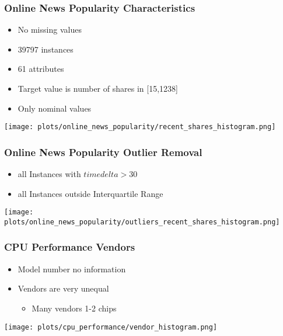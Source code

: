 \documentclass[aspectratio=169]{beamer}
\begin{document}

\begin{frame}{}
\frametitle{Online News Popularity Characteristics}
\begin{minipage}{0.3\textwidth}
\begin{itemize}
\item No missing values
\item 39797 instances
\item 61 attributes
\item Target value is number of shares in [15,1238]
\item Only nominal values
\end{itemize}
\end{minipage}
\begin{minipage}{0.69\textwidth}
    \texttt{[image: plots/online\_news\_popularity/recent\_shares\_histogram.png]}
\end{minipage}
\end{frame}

\begin{frame}{}
\frametitle{Online News Popularity Outlier Removal}
\begin{minipage}{0.3\textwidth}
\begin{itemize}
\item all Instances with $timedelta>30$
\item all Instances outside Interquartile Range
\end{itemize}
\end{minipage}
\begin{minipage}{0.69\textwidth}
    \texttt{[image: plots/online\_news\_popularity/outliers\_recent\_shares\_histogram.png]}
\end{minipage}
\end{frame}

\begin{frame}{}
\frametitle{CPU Performance Vendors}
\begin{minipage}{0.3\textwidth}
\begin{itemize}
\item Model number no information
\item Vendors are very unequal
\begin{itemize}
	\item Many vendors 1-2 chips
\end{itemize}
\end{itemize}
\end{minipage}
\begin{minipage}{0.69\textwidth}
    \texttt{[image: plots/cpu\_performance/vendor\_histogram.png]}
\end{minipage}
\end{frame}
\end{document}
